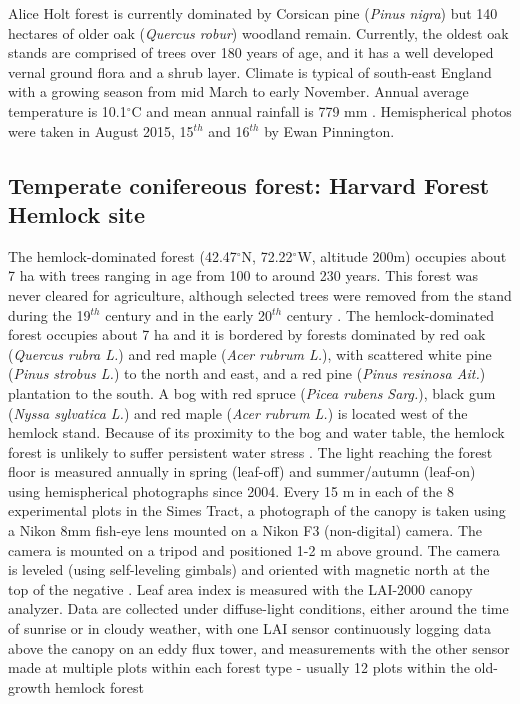 Alice Holt forest is currently dominated by Corsican pine (\textit{Pinus nigra}) but 140 hectares of older oak (\textit{Quercus robur}) woodland remain. Currently, the oldest oak stands are comprised of trees over 180 years of age, and it has a well developed vernal ground flora and a shrub layer. Climate is typical of south-east England with a growing season from mid March to early November. Annual average temperature is 10.1$^{\circ}$C and mean annual rainfall is 779 mm \citep{Benham2012}. Hemispherical photos were taken in August 2015, 15$^{th}$ and 16$^{th}$ by Ewan Pinnington.

\subsection{Temperate conifereous forest: Harvard Forest Hemlock site}

The hemlock-dominated forest (42.47$^{\circ}$N, 72.22$^{\circ}$W, altitude 200m) occupies about 7 ha with trees ranging in age from 100 to around 230 years. This forest was never cleared for agriculture, although selected trees were removed from the stand during the 19$^{th}$ century and in the early 20$^{th}$ century . The hemlock-dominated forest occupies about 7 ha and it is bordered by forests dominated by red oak (\textit{Quercus rubra L.}) and red maple (\textit{Acer rubrum L.}), with scattered white pine (\textit{Pinus strobus L.}) to the north and east, and a red pine (\textit{Pinus resinosa Ait.}) plantation to the south. A bog with red spruce (\textit{Picea rubens Sarg.}), black gum (\textit{Nyssa sylvatica L.}) and red maple (\textit{Acer rubrum L.}) is located west of the hemlock stand. Because of its proximity to the bog and water table, the hemlock forest is unlikely to suffer persistent water stress \citep{Hadley2002}.
The light reaching the forest floor is measured annually in spring (leaf-off) and summer/autumn (leaf-on) using hemispherical photographs since 2004. Every 15 m in each of the 8 experimental plots in the Simes Tract, a photograph of the canopy is taken using a Nikon 8mm fish-eye lens mounted on a Nikon F3 (non-digital) camera. The camera is mounted on a tripod and positioned 1-2 m above ground. The camera is leveled (using self-leveling gimbals) and oriented with magnetic north at the top of the negative \citep{Ellison2005}.
Leaf area index is measured with the LAI-2000 canopy analyzer. Data are collected under diffuse-light conditions, either around the time of sunrise or in cloudy weather, with one LAI sensor continuously logging data above the canopy on an eddy flux tower, and measurements with the other sensor made at multiple plots within each forest type - usually 12 plots within the old-growth hemlock forest \citep{Orwig2009}

